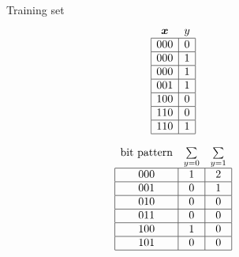 \begin{figure}[!htb]
\small
\begin{minipage}{.95\linewidth}\centering
  \begin{minipage}[b]{.2\linewidth}\centering
    Training set
    \begin{align*}
      \begin{array}{cc}
        \bm{x}                         & y                     \\ \hline
        \multicolumn{1}{|c|}{000} & \multicolumn{1}{c|}{0} \\ \hline
        \multicolumn{1}{|c|}{000} & \multicolumn{1}{c|}{1} \\ \hline
        \multicolumn{1}{|c|}{000} & \multicolumn{1}{c|}{1} \\ \hline
        \multicolumn{1}{|c|}{001} & \multicolumn{1}{c|}{1} \\ \hline
        \multicolumn{1}{|c|}{100} & \multicolumn{1}{c|}{0} \\ \hline
        \multicolumn{1}{|c|}{110} & \multicolumn{1}{c|}{0} \\ \hline
        \multicolumn{1}{|c|}{110} & \multicolumn{1}{c|}{1} \\ \hline
      \end{array}
    \end{align*}
  \end{minipage}
  \begin{minipage}[b]{.4\linewidth}\centering
    \begin{align*}
      \begin{array}{ccc}
        \text{bit pattern}        & \sum\limits_{y=0}      & \multicolumn{1}{l}{\sum\limits_{y=1}} \\ \hline
        \multicolumn{1}{|c|}{000} & \multicolumn{1}{c|}{1} & \multicolumn{1}{c|}{2}                \\ \hline
        \multicolumn{1}{|c|}{001} & \multicolumn{1}{c|}{0} & \multicolumn{1}{c|}{1}                \\ \hline
        \multicolumn{1}{|c|}{010} & \multicolumn{1}{c|}{0} & \multicolumn{1}{c|}{0}                \\ \hline
        \multicolumn{1}{|c|}{011} & \multicolumn{1}{c|}{0} & \multicolumn{1}{c|}{0}                \\ \hline
        \multicolumn{1}{|c|}{100} & \multicolumn{1}{c|}{1} & \multicolumn{1}{c|}{0}                \\ \hline
        \multicolumn{1}{|c|}{101} & \multicolumn{1}{c|}{0} & \multicolumn{1}{c|}{0}                \\ \hline

\end{array}
\end{align*}
\end{minipage}
\end{minipage}
\end{figure}
